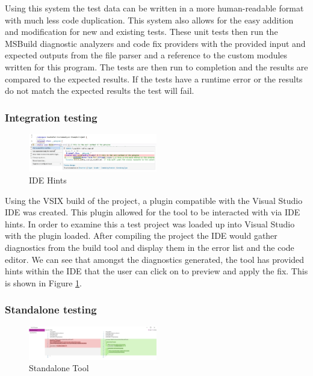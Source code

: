 Using this system the test data can be written in a more human-readable format with much less code duplication. This system also allows for the easy addition and modification for new and existing tests. These unit tests then run the MSBuild diagnostic analyzers and code fix providers with the provided input and expected outputs from the file parser and a reference to the custom modules written for this program. The tests are then run to completion and the results are compared to the expected results. If the tests have a runtime error or the results do not match the expected results the test will fail.


\subsubsection{Integration testing}

\begin{figure}
    \centering
    \caption{IDE Hints}
    \label{fig:IDEHints}
    \includegraphics[width=0.5\textwidth]{Figures/IDEHintsCropped.png}
\end{figure}

Using the VSIX build of the project, a plugin compatible with the Visual Studio IDE was created. This plugin allowed for the tool to be interacted with via IDE hints. In order to examine this a test project was loaded up into Visual Studio with the plugin loaded. After compiling the project the IDE would gather diagnostics from the build tool and display them in the error list and the code editor. We can see that amongst the diagnostics generated, the tool has provided hints within the IDE that the user can click on to preview and apply the fix. This is shown in Figure \ref{fig:IDEHints}.


\subsubsection{Standalone testing}

\begin{figure}
    \centering
    \caption{Standalone Tool}
    \label{fig:StandaloneTool}
    \includegraphics[width=0.5\textwidth]{Figures/StandaloneToolCropped.png}
\end{figure}


